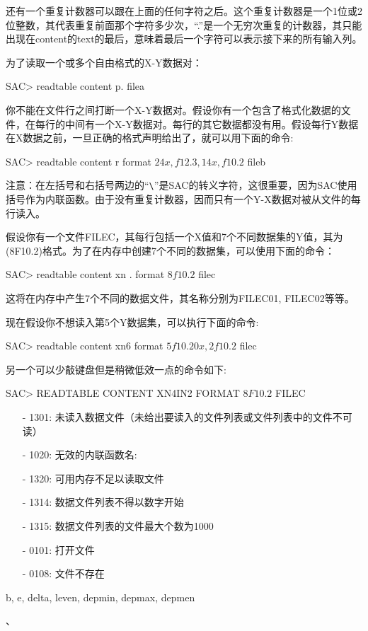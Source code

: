 还有一个重复计数器可以跟在上面的任何字符之后。这个重复计数器是一个1位或2位整数，其代表重复前面那个字符多少次，``.''是一个无穷次重复的计数器，其只能出现在content的text的最后，意味着最后一个字符可以表示接下来的所有输入列。

为了读取一个或多个自由格式的X-Y数据对：
\begin{SACCode}
SAC> readtable content p. filea
\end{SACCode}

你不能在文件行之间打断一个X-Y数据对。假设你有一个包含了格式化数据的文件，在每行的中间有一个X-Y数据对。每行的其它数据都没有用。假设每行Y数据在X数据之前，一旦正确的格式声明给出了，就可以用下面的命令:
\begin{SACCode}
SAC> readtable content r format \(24x,f12.3,14x,f10.2\) fileb
\end{SACCode}
注意：在左括号和右括号两边的``\verb+\+''是SAC的转义字符，这很重要，因为SAC使用括号作为内联函数。由于没有重复计数器，因而只有一个Y-X数据对被从文件的每行读入。

假设你有一个文件FILEC，其每行包括一个X值和7个不同数据集的Y值，其为(8F10.2)格式。为了在内存中创建7个不同的数据集，可以使用下面的命令：
\begin{SACCode}
SAC> readtable content xn . format \(8f10.2\) filec
\end{SACCode}
这将在内存中产生7个不同的数据文件，其名称分别为FILEC01, FILEC02等等。

现在假设你不想读入第5个Y数据集，可以执行下面的命令:
\begin{SACCode}
SAC> readtable content xn6 format \(5f10.20x,2f10.2\) filec
\end{SACCode}
另一个可以少敲键盘但是稍微低效一点的命令如下:
\begin{SACCode}
SAC> READTABLE CONTENT XN4IN2 FORMAT \(8F10.2\) FILEC
\end{SACCode}

\begin{itemize}
\item[-]1301: 未读入数据文件（未给出要读入的文件列表或文件列表中的文件不可读）
\item[-]1020: 无效的内联函数名:
\item[-]1320: 可用内存不足以读取文件
\item[-]1314: 数据文件列表不得以数字开始
\item[-]1315: 数据文件列表的文件最大个数为1000
\end{itemize}

\begin{itemize}
\item[-]0101: 打开文件
\item[-]0108: 文件不存在
\end{itemize}

b, e, delta, leven, depmin, depmax, depmen

、
